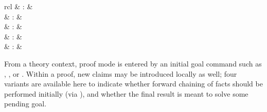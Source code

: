 \begin{isabellebody}
\begin{isamarkuptext}
\begin{matharray}{rcl}
    \hypertarget{command.have}{\hyperlink{command.have}{\mbox{}}} & : &  \\
    \hypertarget{command.show}{\hyperlink{command.show}{\mbox{}}} & : &  \\
    \hypertarget{command.hence}{\hyperlink{command.hence}{\mbox{}}} & : &  \\
    \hypertarget{command.thus}{\hyperlink{command.thus}{\mbox{}}} & : &  \\
    \hypertarget{command.print-statement}{\hyperlink{command.print-statement}{\mbox{}}}\isa{{\isachardoublequote}\isactrlsup {\isacharasterisk}{\isachardoublequote}} & : &  \\
  \end{matharray}

  From a theory context, proof mode is entered by an initial goal
  command such as \hyperlink{command.lemma}{\mbox{}}, \hyperlink{command.theorem}{\mbox{}}, or
  \hyperlink{command.corollary}{\mbox{}}.  Within a proof, new claims may be
  introduced locally as well; four variants are available here to
  indicate whether forward chaining of facts should be performed
  initially (via \hyperlink{command.then}{\mbox{}}), and whether the final result
  is meant to solve some pending goal.


\end{isamarkuptext}
\end{isabellebody}

